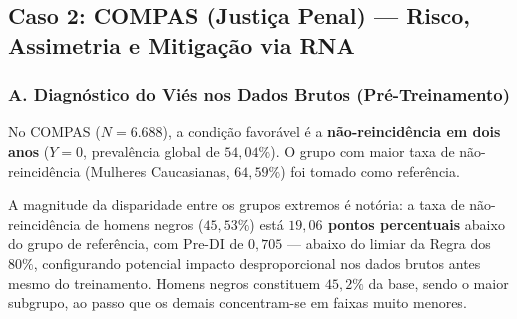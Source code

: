 \subsection{Caso 2: COMPAS (Justiça Penal) --- Risco, Assimetria e Mitigação via RNA}
\label{subsec:caso_compas}

\subsubsection{A. Diagnóstico do Viés nos Dados Brutos (Pré-Treinamento)}

No COMPAS ($N = 6.688$), a condição favorável é a \textbf{não-reincidência em dois anos} ($Y = 0$, prevalência global de $54,04\%$). O grupo com maior taxa de não-reincidência (Mulheres Caucasianas, $64,59\%$) foi tomado como referência.

\begin{table}[H]
    \centering
    \caption{Disparidades de paridade estatística pré-treino por subgrupo interseccional (COMPAS).}
    \vspace{2mm}
    \label{tab:compas_pretrain}
\end{table}

A magnitude da disparidade entre os grupos extremos é notória: a taxa de não-reincidência de homens negros ($45,53\%$) está \textbf{$19,06$ pontos percentuais} abaixo do grupo de referência, com Pre-DI de $0,705$ --- abaixo do limiar da Regra dos $80\%$, configurando potencial impacto desproporcional nos dados brutos antes mesmo do treinamento. Homens negros constituem $45,2\%$ da base, sendo o maior subgrupo, ao passo que os demais concentram-se em faixas muito menores.

